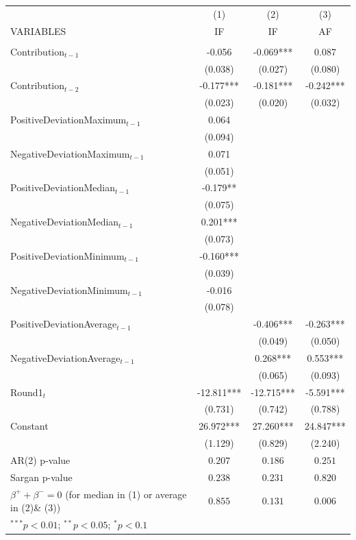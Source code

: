 
\begin{tabular}{lccc} \hline
 & (1) & (2) & (3) \\
VARIABLES & IF & IF & AF \\ \hline
 &  &  &  \\
Contribution$_{t-1}$    & -0.056 & -0.069*** & 0.087 \\
 & (0.038) & (0.027) & (0.080) \\
Contribution$_{t-2}$    & -0.177*** & -0.181*** & -0.242*** \\
 & (0.023) & (0.020) & (0.032) \\
PositiveDeviationMaximum$_{t-1}$    & 0.064 &  &  \\
 & (0.094) &  &  \\
NegativeDeviationMaximum$_{t-1}$ & 0.071 &  &  \\
 & (0.051) &  &  \\
PositiveDeviationMedian$_{t-1}$ & -0.179** &  &  \\
 & (0.075) &  &  \\
NegativeDeviationMedian$_{t-1}$& 0.201*** &  &  \\
 & (0.073) &  &  \\
PositiveDeviationMinimum$_{t-1}$ & -0.160*** &  &  \\
 & (0.039) &  &  \\
NegativeDeviationMinimum$_{t-1}$ & -0.016 &  &  \\
 & (0.078) &  &  \\
PositiveDeviationAverage$_{t-1}$ &  & -0.406*** & -0.263*** \\
 &  & (0.049) & (0.050) \\
NegativeDeviationAverage$_{t-1}$  &  & 0.268*** & 0.553*** \\
 &  & (0.065) & (0.093) \\
Round1$_{t}$ & -12.811*** & -12.715*** & -5.591*** \\
 & (0.731) & (0.742) & (0.788) \\
Constant & 26.972*** & 27.260*** & 24.847*** \\
 & (1.129) & (0.829) & (2.240) \\
 \midrule
AR(2) p-value                                     & $0.207$         & $0.186$         & $0.251$        \\
Sargan p-value                                    & $0.238$         & $0.231$         & $0.820$        \\
$\beta^{+} + \beta^{-} = 0$ (for median in (1) or average in (2)\& (3)) & $0.855$         & $0.131$         & $0.006$       \\
\bottomrule
\multicolumn{3}{l}{\scriptsize{$^{***}p<0.01$; $^{**}p<0.05$; $^{*}p<0.1$}}
\end{tabular}
